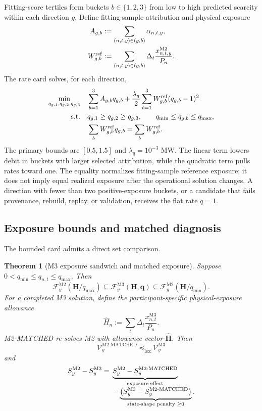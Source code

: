\documentclass[10pt,journal]{IEEEtran}
\newtheorem{theorem}{Theorem}
\newcommand{\Mtwo}{\ensuremath{\mathrm{M2}}}
\newcommand{\Mthree}{\ensuremath{\mathrm{M3}}}
\newcommand{\MtwoMatched}{\ensuremath{\mathrm{M2\text{-}MATCHED}}}
\newcommand{\lexleq}{\preceq_{\mathrm{lex}}}
\begin{document}
Fitting-score tertiles form buckets $b\in\{1,2,3\}$ from low to high predicted scarcity within each direction $g$. Define fitting-sample attribution and physical exposure
\begin{align}
A_{g,b}
&:=\sum_{(n,t,y)\in(g,b)}\alpha_{n,t,y},
\notag\\
W_{g,b}^{\rm ref}
&:=\sum_{(n,t,y)\in(g,b)}
\Delta_t\frac{x_{n,t,y}^{\Mtwo}}{P_n}.
\label{eq:card_inputs}
\end{align}
The rate card solves, for each direction,
\begin{align}
\min_{q_{g,1},q_{g,2},q_{g,3}}\quad
&\sum_{b=1}^3A_{g,b}q_{g,b}
+\frac{\lambda_q}{2}\sum_{b=1}^3
W_{g,b}^{\rm ref}(q_{g,b}-1)^2
\label{eq:card_qp}\\
\mathrm{s.t.}\quad
&q_{g,1}\geq q_{g,2}\geq q_{g,3},
\qquad q_{\min}\leq q_{g,b}\leq q_{\max},
\notag\\
&\sum_bW_{g,b}^{\rm ref}q_{g,b}
=\sum_bW_{g,b}^{\rm ref}.
\notag
\end{align}
The primary bounds are $[0.5,1.5]$ and $\lambda_q=10^{-3}$ MW. The linear term lowers debit in buckets with larger selected attribution, while the quadratic term pulls rates toward one. The equality normalizes fitting-sample reference exposure; it does not imply equal realized exposure after the operational solution changes. A direction with fewer than two positive-exposure buckets, or a candidate that fails provenance, rebuild, replay, or validation, receives the flat rate $q=1$.

\subsection{Exposure bounds and matched diagnosis}

The bounded card admits a direct set comparison.

\begin{theorem}[M3 exposure sandwich and matched exposure]
\label{thm:m3}
Suppose $0<q_{\min}\leq q_{n,t}\leq q_{\max}$. Then
\begin{equation}
\mathcal F_y^{\Mtwo}(\bm H/q_{\max})
\subseteq
\mathcal F_y^{\Mthree}(\bm H,\bm q)
\subseteq
\mathcal F_y^{\Mtwo}(\bm H/q_{\min}).
\label{eq:m3_sandwich}
\end{equation}
For a completed M3 solution, define the participant-specific physical-exposure allowance
\begin{equation}
\widehat H_n:=
\sum_t\Delta_t\frac{x_{n,t}^{\Mthree}}{P_n}.
\label{eq:matched_allowance}
\end{equation}
M2-MATCHED re-solves M2 with allowance vector $\widehat{\bm H}$. Then
\begin{equation}
\mathcal V_y^{\MtwoMatched}\lexleq\mathcal V_y^{\Mthree}
\label{eq:matched_order}
\end{equation}
and
\begin{align}
S_y^{\Mtwo}-S_y^{\Mthree}
={}&\underbrace{S_y^{\Mtwo}-S_y^{\MtwoMatched}}
_{\text{exposure effect}}
\notag\\[-1mm]
&-\underbrace{\left(S_y^{\Mthree}-S_y^{\MtwoMatched}\right)}
_{\text{state-shape penalty }\geq0}.
\label{eq:matched_decomposition}
\end{align}
\end{theorem}
\end{document}
